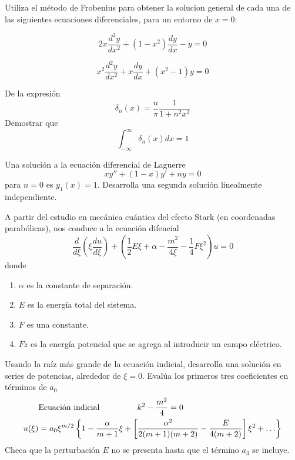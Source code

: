 \item Utiliza el método de Frobenius para obtener la solucion general de cada una de las siguientes ecuaciones diferenciales, para un entorno de $x = 0$:
\begin{enumerate}[label=(\alph*)]
\begin{fleqn}
\item  \[ 2 x \dfrac{d^{2} y}{d x^{2}} + (1 - x^{2}) \dfrac{d y}{d x} - y = 0 \]
\item \[ x^{2} \dfrac{d^{2} y}{d x^{2}} + x \dfrac{d y}{d x} + (x^{2} - 1) y = 0\]
\end{fleqn}
\end{enumerate}
\item De la expresión
\[ \delta_{n} (x) = \dfrac{n}{\pi} \dfrac{1}{1+n^{2}x^{2}}\]
Demostrar que
\[ \int_{-\infty}^{\infty} \delta_{n} (x) d x = 1 \]
\item Una solución a la ecuación diferencial de Laguerre
\[ xy'' + (1-x) y' + ny = 0\]
para $n=0$ es $y_{1}(x)=1$. Desarrolla una segunda solución linealmente independiente.
\item A partir del estudio en mecánica cuántica del efecto Stark (en coordenadas parabólicas), nos conduce a la ecuación difencial
\[ \dfrac{d}{d \xi} \left( \xi \dfrac{d u}{d \xi} \right) + \left( \dfrac{1}{2} E \xi + \alpha - \dfrac{m^{2}}{4 \xi} - \dfrac{1}{4} F \xi^{2} \right) u = 0 \]
donde
\begin{enumerate}[label=(\roman*)]
\item $\alpha$ es la constante de separación.
\item $E$ es la energía total del sistema.
\item $F$ es una constante.
\item $Fz$ es la energía potencial que se agrega al introducir un campo eléctrico.
\end{enumerate}
Usando la raíz más grande de la ecuación indicial, desarrolla una solución en series de potencias, alrededor de $\xi=0$. Evalúa los primeros tres coeficientes en términos de $a_{0}$
\[  \begin{split}
& \text{Ecuación indicial } \hspace{1.5cm} k^{2} - \dfrac{m^{2}}{4} = 0 \\
u(\xi) &=  a_{0} \xi^{m/2} \left\lbrace 1 - \dfrac{\alpha}{m+1} \xi + \left[ \dfrac{\alpha^{2}}{2(m+1)(m+2)} - \dfrac{E}{4(m+2)} \right] \xi^{2} + \ldots \right\rbrace
\end{split} \]
Checa que la perturbación $E$ no se presenta hasta que el término $a_{3}$ se incluye.
